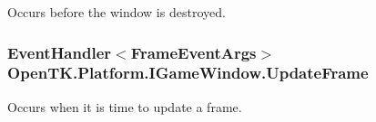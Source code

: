 Occurs before the window is destroyed. 

\hypertarget{interface_open_t_k_1_1_platform_1_1_i_game_window_adb51747b40dcd20623f79ab492e28cd7}{
\subsubsection[{Update\-Frame}]{\setlength{\rightskip}{0pt plus 5cm}Event\-Handler$<${\bf Frame\-Event\-Args}$>$ Open\-T\-K.\-Platform.\-I\-Game\-Window.\-Update\-Frame}}\label{interface_open_t_k_1_1_platform_1_1_i_game_window_adb51747b40dcd20623f79ab492e28cd7}


Occurs when it is time to update a frame. 

